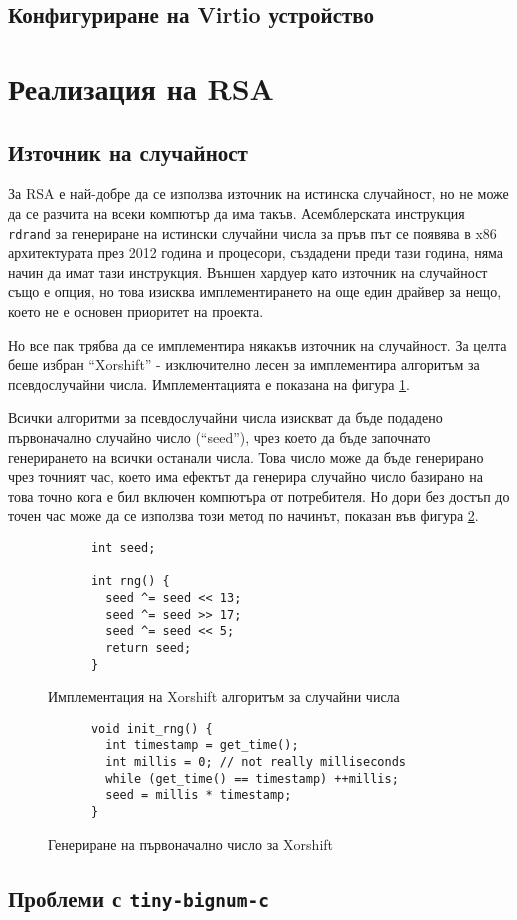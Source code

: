   \subsection{Конфигуриране на Virtio устройство}

\section{Реализация на RSA}
  \subsection{Източник на случайност}
  За RSA е най-добре да се използва източник на истинска случайност, но не може да се разчита на всеки компютър да има такъв. Асемблерската инструкция {\tt rdrand} за генериране на истински случайни числа за пръв път се появява в x86 архитектурата през 2012 година и процесори, създадени преди тази година, няма начин да имат тази инструкция. Външен хардуер като източник на случайност също е опция, но това изисква имплементирането на още един драйвер за нещо, което не е основен приоритет на проекта.

  Но все пак трябва да се имплементира някакъв източник на случайност. За целта беше избран ``Xorshift'' - изключително лесен за имплементира алгоритъм за псевдослучайни числа. Имплементацията е показана на фигура \ref{fig:xorshift}.

  Всички алгоритми за псевдослучайни числа изискват да бъде подадено първоначално случайно число (``seed''), чрез което да бъде започнато генерирането на всички останали числа. Това число може да бъде генерирано чрез точният час, което има ефектът да генерира случайно число базирано на това точно кога е бил включен компютъра от потребителя. Но дори без достъп до точен час може да се използва този метод по начинът, показан във фигура \ref{fig:seed-generation}. %

  \begin{figure}[ht]
    \centering
    \caption{Имплементация на Xorshift алгоритъм за случайни числа}
    \begin{verbatim}
      int seed;

      int rng() {
        seed ^= seed << 13;
        seed ^= seed >> 17;
        seed ^= seed << 5;
        return seed;
      }
    \end{verbatim}
    \label{fig:xorshift}
  \end{figure}

  \begin{figure}[ht]
    \centering
    \caption{Генериране на първоначално число за Xorshift}
    \begin{verbatim}
      void init_rng() {
        int timestamp = get_time();
        int millis = 0; // not really milliseconds
        while (get_time() == timestamp) ++millis;
        seed = millis * timestamp;
      }
    \end{verbatim}
    \label{fig:seed-generation}
  \end{figure}

  \subsection{Проблеми с {\tt tiny-bignum-c}}

